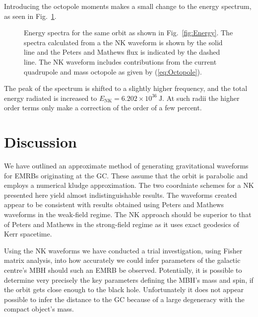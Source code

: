 \documentclass[useAMS,usedcolumn,usegraphicx,usenatbib]{mn2e}
\newcommand{\eqnref}[1]{(\ref{eq:#1})}
\newcommand{\figref}[1]{Fig.~\ref{fig:#1}}
\newcommand{\units}[1]{\ensuremath{~\mathrm{#1}}}
\newcommand{\sub}[1]{\ensuremath{_\mathrm{#1}}}
\begin{document}
Introducing the octopole moments makes a small change to the energy spectrum, as seen in \figref{Energy_oct}.
\begin{figure}
  \begin{center}
    \caption{Energy spectra for the same orbit as shown in \figref{Energy}. The spectra calculated from a the NK waveform is shown by the solid line and the Peters and Mathews flux is indicated by the dashed line. The NK waveform includes contributions from the current quadrupole and mass octopole as given by \eqnref{Octopole}.}
    \label{fig:Energy_oct}
  \end{center}
\end{figure}
The peak of the spectrum is shifted to a slightly higher frequency, and the total energy radiated is increased to $E\sub{NK} = 6.202 \times 10^{36}\units{J}$. At such radii the higher order terms only make a correction of the order of a few percent.

\section{Discussion\label{sec:End}}

We have outlined an approximate method of generating gravitational waveforms for EMRBs originating at the GC. These assume that the orbit is parabolic and employs a numerical kludge approximation. The two coordniate schemes for a NK presented here yield almost indistinguishable results. The waveforms created appear to be consistent with results obtained using Peters and Mathews waveforms in the weak-field regime. The NK approach should be superior to that of Peters and Mathews in the strong-field regime as it uses exact geodesics of Kerr spacetime.

Using the NK waveforms we have conducted a trial investigation, using Fisher matrix analysis, into how accurately we could infer parameters of the galactic centre's MBH should such an EMRB be observed. Potentially, it is possible to determine very precisely the key parameters defining the MBH's mass and spin, if the orbit gets close enough to the black hole. Unfortunately it does not appear possible to infer the distance to the GC because of a large degeneracy with the compact object's mass.
\end{document}
